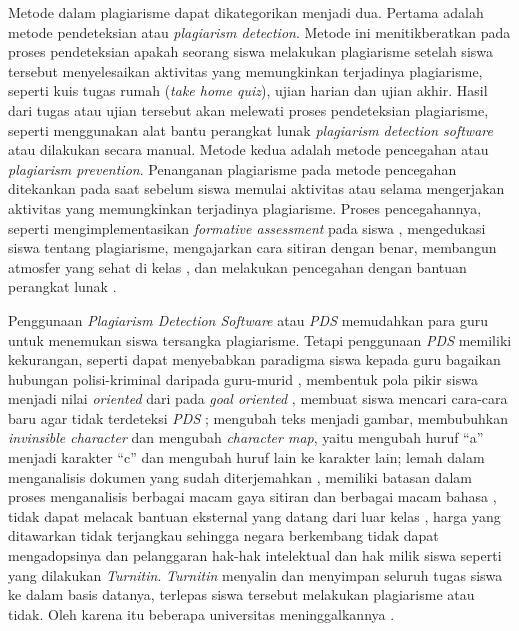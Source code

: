 Metode dalam plagiarisme dapat dikategorikan menjadi dua. Pertama
adalah metode pendeteksian atau \emph{plagiarism detection}. Metode
ini menitikberatkan pada proses pendeteksian apakah seorang siswa
melakukan plagiarisme setelah siswa tersebut menyelesaikan aktivitas
yang memungkinkan terjadinya plagiarisme, seperti kuis tugas rumah
(\emph{take home quiz}), ujian harian dan ujian akhir. Hasil dari
tugas atau ujian tersebut akan melewati proses pendeteksian plagiarisme,
seperti menggunakan alat bantu perangkat lunak \emph{plagiarism
  detection software} \parencite{neill2004web} atau dilakukan secara
manual. Metode kedua adalah metode pencegahan atau \emph{plagiarism
  prevention}. Penanganan plagiarisme pada metode pencegahan
ditekankan pada saat sebelum siswa memulai aktivitas atau selama
mengerjakan aktivitas yang memungkinkan terjadinya plagiarisme. Proses
pencegahannya, seperti mengimplementasikan \emph{formative assessment}
pada siswa \parencite{leung2017instructional}, mengedukasi siswa
tentang plagiarisme, mengajarkan cara sitiran dengan benar, membangun
atmosfer yang sehat di kelas \parencite{mclafferty2004electronic}, dan
melakukan pencegahan dengan bantuan perangkat lunak \parencite{hellas2017plagiarism}.

Penggunaan \emph{Plagiarism Detection Software} atau \emph{PDS}
memudahkan para guru untuk menemukan siswa tersangka
plagiarisme. Tetapi penggunaan \emph{PDS} memiliki kekurangan, seperti
dapat menyebabkan paradigma siswa kepada guru bagaikan hubungan
polisi-kriminal daripada guru-murid \parencite{howard2002don},
membentuk pola pikir siswa menjadi nilai \emph{oriented} dari pada
\emph{goal oriented} \parencite{dweck1988social}, membuat siswa
mencari cara-cara baru agar tidak terdeteksi \emph{PDS}
\parencite{kiss2013loopholes}; mengubah teks menjadi gambar,
membubuhkan \emph{invinsible character} dan mengubah \emph{character
  map}, yaitu mengubah huruf ``a'' menjadi karakter ``c'' dan mengubah
huruf lain ke karakter lain; lemah dalam menganalisis dokumen yang
sudah diterjemahkan \parencite{meuschke2013state}, memiliki batasan
dalam proses menganalisis berbagai macam gaya sitiran
\parencite{modiba2016evaluating} dan berbagai macam bahasa
\parencite{martins2014plagiarism}, tidak dapat melacak bantuan
eksternal yang datang dari luar kelas
\parencite{hellas2017plagiarism}, harga yang ditawarkan tidak
terjangkau sehingga negara berkembang tidak dapat mengadopsinya
\parencite{agustina2017exploring, modiba2016evaluating} dan
pelanggaran hak-hak intelektual dan hak milik siswa seperti yang
dilakukan \emph{Turnitin}. \emph{Turnitin} menyalin dan menyimpan
seluruh tugas siswa ke dalam basis datanya, terlepas siswa tersebut
melakukan plagiarisme atau tidak. Oleh karena itu beberapa universitas
meninggalkannya \parencite{park2004rebels}.


